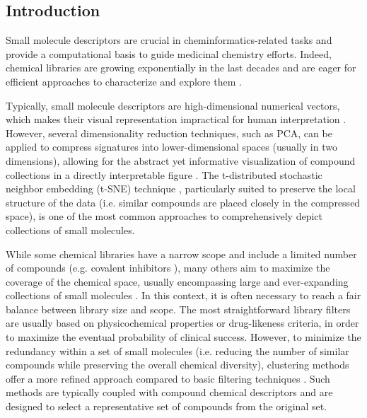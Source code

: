 \subsection{Introduction}

Small molecule descriptors are crucial in cheminformatics-related tasks and provide a computational basis to guide medicinal chemistry efforts\cite{mcgibbon_intuition_2023}. Indeed, chemical libraries are growing exponentially in the last decades and are eager for efficient approaches to characterize and explore them \cite{kim_pubchem_2023, irwin_zinc20free_2020}.

Typically, small molecule descriptors are high-dimensional numerical vectors, which makes their visual representation impractical for human interpretation \cite{cereto-massague_molecular_2015}. However, several dimensionality reduction techniques, such as PCA, can be applied to compress signatures into lower-dimensional spaces (usually in two dimensions), allowing for the abstract yet informative visualization of compound collections in a directly interpretable figure \cite{probst_visualization_2020, akella_cheminformatics_2010}. The t-distributed stochastic neighbor embedding (t-SNE) technique \cite{van_der_maaten_laurens_geoffrey_hinton_visualizing_2008}, particularly suited to preserve the local structure of the data (i.e. similar compounds are placed closely in the compressed space), is one of the most common approaches to comprehensively depict collections of small molecules. 

While some chemical libraries have a narrow scope and include a limited number of compounds (e.g. covalent inhibitors \cite{du_covalentindb_2021}), many others aim to maximize the coverage of the chemical space, usually encompassing large and ever-expanding collections of small molecules \cite{hoffmann_next_2019}. In this context, it is often necessary to reach a fair balance between library size and scope. The most straightforward library filters are usually based on physicochemical properties or drug-likeness criteria, in order to maximize the eventual probability of clinical success. However, to minimize the redundancy within a set of small molecules (i.e. reducing the number of similar compounds while preserving the overall chemical diversity), clustering methods offer a more refined approach compared to basic filtering techniques \cite{lipkowitz_clustering_2002}. Such methods are typically coupled with compound chemical descriptors and are designed to select a representative set of compounds from the original set. 

